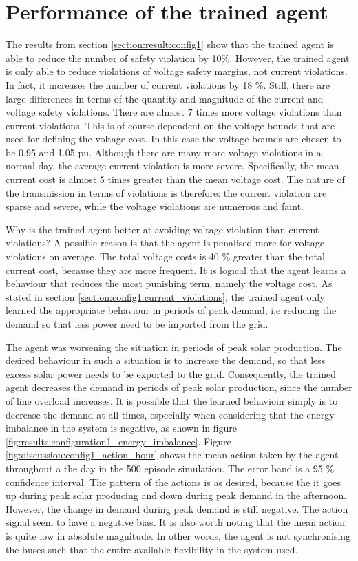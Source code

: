 \documentclass[class=book, crop=false]{standalone}
\begin{document}
\section{Performance of the trained agent}
The results from section \ref{section:result:config1} show that the trained agent is able to reduce the number of safety violation by 10\%. However, the trained agent is only able to reduce violations of voltage safety margins, not current violations. In fact, it increases the number of current violations by 18 \%. Still, there are large differences in terms of the quantity and magnitude of the current and voltage safety violations. There are almost 7 times more voltage violations than current violations. This is of course dependent on the voltage bounds that are used for defining the voltage cost. In this case the voltage bounds are chosen to be 0.95 and 1.05 pu. Although there are many more voltage violations in a normal day, the average current violation is more severe. Specifically, the mean current cost is almost 5 times greater than the mean voltage cost. The nature of the transmission in terms of violations is therefore: the current violation are sparse and severe, while the voltage violations are numerous and faint. 

Why is the trained agent better at avoiding voltage violation than current violations? A possible reason is that the agent is penalised more for voltage violations on average. The total voltage costs is 40 \% greater than the total current cost, because they are more frequent. It is logical that the agent learns a behaviour that reduces the most punishing term, namely the voltage cost. As stated in section \ref{section:config1:current_violations}, the trained agent only learned the appropriate behaviour in periods of peak demand, i.e reducing the demand so that less power need to be imported from the grid.

The agent was worsening the situation in periods of peak solar production. The desired behaviour in such a situation is to increase the demand, so that less excess solar power needs to be exported to the grid. Consequently, the trained agent decreases the demand in periods of peak solar production, since the number of line overload increases. It is possible that the learned behaviour simply is to decrease the demand at all times, especially when considering that the energy imbalance in the system is negative, as shown in figure \ref{fig:results:configuration1_energy_imbalance}. Figure \ref{fig:discussion:config1_action_hour} shows the mean action taken by the agent throughout a the day in the 500 episode simulation. The error band is a 95 \% confidence interval. The pattern of the actions is as desired, because the it goes up during peak solar producing and down during peak demand in the afternoon. However, the change in demand during peak demand is still negative. The action signal seem to have a negative bias. It is also worth noting that the mean action is quite low in absolute magnitude. In other words, the agent is not synchronising the buses such that the entire available flexibility in the system used.
\end{document}
